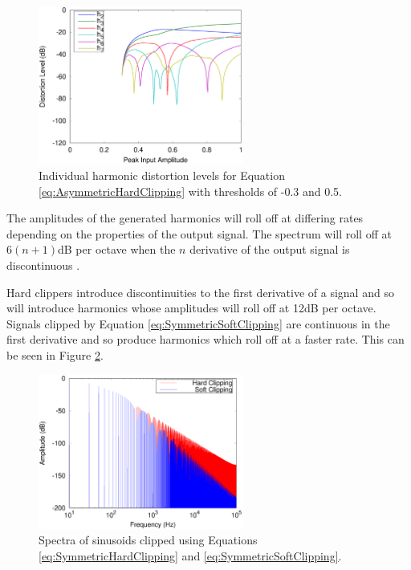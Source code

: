 			\begin{figure}[h!]
				\centering
				\includegraphics[width=0.6\textwidth]{chapter5/Images/AsymmetricHardClippingHarmonics.eps}
				\caption{Individual harmonic distortion levels for Equation
					 \ref{eq:AsymmetricHardClipping} with thresholds of -0.3 and 0.5.}
				\label{fig:AsymmetricHardClippingHarmonics}
			\end{figure}

			The amplitudes of the generated harmonics will roll off at differing rates depending on the
			properties of the output signal. The spectrum will roll off at $6(n+1)$dB per octave when
			the $n$ derivative of the output signal is discontinuous \citep{kraght2000aliasing}.

			Hard clippers introduce discontinuities to the first derivative of a signal and so will introduce
			harmonics whose amplitudes will roll off at 12dB per octave. Signals clipped by Equation
			\ref{eq:SymmetricSoftClipping} are continuous in the first derivative and so produce harmonics
			which roll off at a faster rate. This can be seen in Figure \ref{fig:ClippingSpectra}.

			\begin{figure}[h!]
				\centering
				\includegraphics[width=0.6\textwidth]{chapter5/Images/ClippingSpectra.eps}
				\caption{Spectra of sinusoids clipped using Equations \ref{eq:SymmetricHardClipping} and
			                 \ref{eq:SymmetricSoftClipping}.}
				\label{fig:ClippingSpectra}
			\end{figure}

